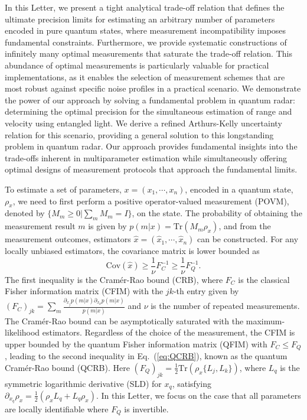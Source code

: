 \documentclass[
aps,
prl,
twocolumn,

superscriptaddress]{revtex4-2}
\begin{document}
In this Letter, we present a tight analytical trade-off relation that defines the ultimate precision limits for estimating an arbitrary number of parameters encoded in pure quantum states, where measurement incompatibility imposes fundamental constraints. Furthermore, we provide systematic constructions of infinitely many optimal measurements that saturate the trade-off relation. This abundance of optimal measurements is particularly valuable for practical implementations, as it enables the selection of measurement schemes that are most robust against specific noise profiles in a practical scenario.
We demonstrate the power of our approach by solving a fundamental problem in quantum radar: determining the optimal precision for the simultaneous estimation of range and velocity using entangled light. We derive a refined Arthurs-Kelly uncertainty relation for this scenario, providing a general solution to this longstanding problem in quantum radar. Our approach provides fundamental insights into the trade-offs inherent in multiparameter estimation while simultaneously offering optimal designs of measurement protocols that approach the fundamental limits.


To estimate a set of parameters, $x=(x_1,\cdots, x_n)$, encoded in a quantum state, $\rho_x$, we need to first perform a positive operator-valued measurement (POVM), denoted by $\{M_m\geq 0|\sum_m M_m=I\}$, on the state. The probability of obtaining the measurement result $m$ is given by $p(m|x)=\text{Tr}(M_m\rho_x)$, and from the measurement outcomes, estimators $\hat{x}=(\hat{x}_1,\cdots,\hat{x}_n)$ can be constructed. For any locally unbiased estimators, the covariance matrix is lower bounded as
\begin{equation}\label{eq:QCRB}
    \text{Cov}(\hat{x})\geq \frac{1}{\nu} F_C^{-1}\geq \frac{1}{\nu} F_Q^{-1}.
\end{equation}
The first inequality is the Cramér-Rao bound (CRB)\cite{Cram46}, where $F_C$ is the classical Fisher information matrix (CFIM) with the $jk$-th entry given by $(F_C)_{jk}=\sum_{m}\frac{\partial_{x_j}p(m|x)\partial_{x_k}p(m|x)}{p(m|x)}$ and $\nu$ is the number of repeated measurements. The Cramér-Rao bound can be asymptotically saturated with the maximum-likelihood estimators. Regardless of the choice of the measurement, the CFIM is upper bounded by the quantum Fisher information matrix (QFIM) with $F_C \leq F_Q$, leading to the second inequality in Eq.~(\ref{eq:QCRB}), known as the quantum Cramér-Rao bound (QCRB)\cite{Hels76book}.
Here $(F_Q)_{jk}=\frac{1}{2}\text{Tr}(\rho_x\{L_j,L_k\})$, where $L_{q}$ is the symmetric logarithmic derivative (SLD) for $x_{q}$, satisfying $\partial_{x_{q}}\rho_x=\frac{1}{2}(\rho_xL_{q}+L_{q}\rho_x)$. In this Letter, we focus on the case that all parameters are locally identifiable where $F_Q$ is invertible.
\end{document}
